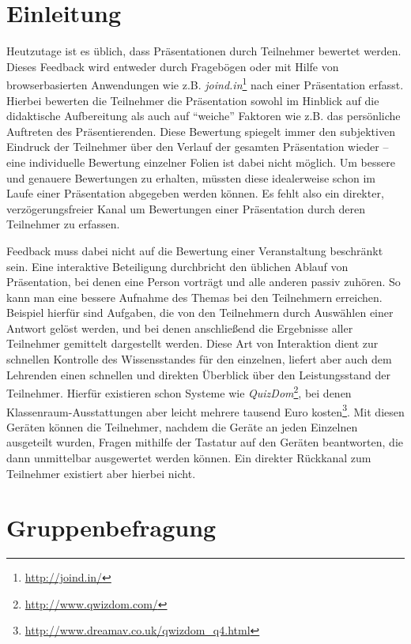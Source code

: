 \section{Einleitung}

Heutzutage ist es üblich, dass Präsentationen durch Teilnehmer bewertet werden. Dieses Feedback wird entweder durch Fragebögen oder mit Hilfe von browserbasierten Anwendungen wie z.B. \emph{joind.in}\footnote{\url{http://joind.in/}} nach einer Präsentation erfasst. Hierbei bewerten die Teilnehmer die Präsentation sowohl im Hinblick auf die didaktische Aufbereitung als auch auf "`weiche"' Faktoren wie z.B. das persönliche Auftreten des Präsentierenden. Diese Bewertung spiegelt immer den subjektiven Eindruck der Teilnehmer über den Verlauf der gesamten Präsentation wieder -- eine individuelle Bewertung einzelner Folien ist dabei nicht möglich. Um bessere und genauere Bewertungen zu erhalten, müssten diese idealerweise schon im Laufe einer Präsentation abgegeben werden können. Es fehlt also ein direkter, verzögerungsfreier Kanal um Bewertungen einer Präsentation durch deren Teilnehmer zu erfassen.

Feedback muss dabei nicht auf die Bewertung einer Veranstaltung beschränkt sein. Eine interaktive Beteiligung durchbricht den üblichen Ablauf von Präsentation, bei denen eine Person vorträgt und alle anderen passiv zuhören. So kann man eine bessere Aufnahme des Themas bei den Teilnehmern erreichen. Beispiel hierfür sind Aufgaben, die von den Teilnehmern durch Auswählen einer Antwort gelöst werden, und bei denen anschließend die Ergebnisse aller Teilnehmer gemittelt dargestellt werden. Diese Art von Interaktion dient zur schnellen Kontrolle des Wissensstandes für den einzelnen, liefert aber auch dem Lehrenden einen schnellen und direkten Überblick über den Leistungsstand der Teilnehmer. Hierfür existieren schon Systeme wie \emph{QuizDom}\footnote{\url{http://www.qwizdom.com/}}, bei denen Klassenraum-Ausstattungen aber leicht mehrere tausend Euro kosten\footnote{\url{http://www.dreamav.co.uk/qwizdom_q4.html}}. Mit diesen Geräten können die Teilnehmer, nachdem die Geräte an jeden Einzelnen ausgeteilt wurden, Fragen mithilfe der Tastatur auf den Geräten beantworten, die dann unmittelbar ausgewertet werden können. Ein direkter Rückkanal zum Teilnehmer existiert aber hierbei nicht.

\section{Gruppenbefragung}
\label{l:gruppenbefragung}

